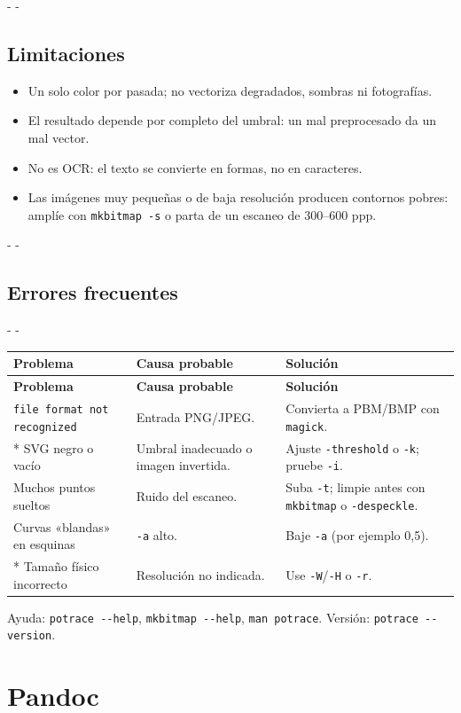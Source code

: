 \documentclass[11pt,a4paper]{article}
\makeatletter
\newcommand{\necesitaespacio}[1]{\par\penalty-100\begingroup
	\setlength{\dimen@}{#1}\dimen@ii\pagegoal\advance\dimen@ii-\pagetotal
	\ifdim\dimen@>\dimen@ii\ifdim\dimen@ii>\z@\vfil\fi\penalty-\@M\fi\endgroup}
\newenvironment{errores}{%
	\par\begingroup\small
	\begin{longtable}{L{4.1cm}L{4.9cm}L{6.0cm}}
		\toprule\rowcolor{tablacab}\cab{Problema} & \cab{Causa probable} & \cab{Solución} \\ \midrule
		\endfirsthead
		\toprule\rowcolor{tablacab}\cab{Problema} & \cab{Causa probable} & \cab{Solución} \\ \midrule
		\endhead
		\bottomrule
		\endfoot}
	{\end{longtable}\endgroup}
\newcommand{\cmd}[1]{\texttt{\textcolor{colcmd}{#1}}}      %
\newcommand{\opt}[1]{\texttt{\textcolor{colopt}{#1}}}      %
\newcommand{\cab}[1]{\textbf{#1}}
\makeatother
\begin{document}
	\necesitaespacio{8\baselineskip}
	\subsection{Limitaciones}
	
	\begin{limitacion}
		\begin{itemize}
			\item Un solo color por pasada; no vectoriza degradados, sombras ni fotografías.
			\item El resultado depende por completo del umbral: un mal preprocesado da un mal vector.
			\item No es OCR: el texto se convierte en formas, no en caracteres.
			\item Las imágenes muy pequeñas o de baja resolución producen contornos pobres: amplíe con \cmd{mkbitmap -s} o parta de un escaneo de 300--600 ppp.
		\end{itemize}
	\end{limitacion}
	
	\necesitaespacio{21\baselineskip}
	\subsection{Errores frecuentes}
	
	\necesitaespacio{17\baselineskip}
	\begin{errores}
		\texttt{file format not recognized} & Entrada PNG/JPEG. & Convierta a PBM/BMP con \cmd{magick}.\\*
		SVG negro o vacío & Umbral inadecuado o imagen invertida. & Ajuste \opt{-threshold} o \opt{-k}; pruebe \opt{-i}.\\
		Muchos puntos sueltos & Ruido del escaneo. & Suba \opt{-t}; limpie antes con \cmd{mkbitmap} o \opt{-despeckle}.\\
		Curvas «blandas» en esquinas & \opt{-a} alto. & Baje \opt{-a} (por ejemplo 0,5).\\*
		Tamaño físico incorrecto & Resolución no indicada. & Use \opt{-W}/\opt{-H} o \opt{-r}.\\
	\end{errores}
	
	Ayuda: \cmd{potrace -{}-help}, \cmd{mkbitmap -{}-help}, \cmd{man potrace}. Versión: \cmd{potrace -{}-version}.
	
	\clearpage
	\section{Pandoc}\label{sec:pandoc}
	
\end{document}
